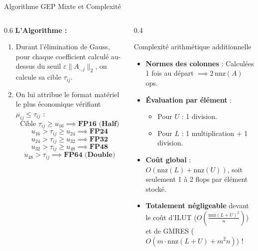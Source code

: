 \documentclass[10pt,aspectratio=169]{beamer}
\begin{document}
\begin{frame}{Algorithme GEP Mixte et Complexité}
    \begin{columns}
        \begin{column}{0.6\textwidth}
            \textbf{L'Algorithme :}
            \begin{enumerate}
                \item Durant l'élimination de Gauss, pour chaque coefficient calculé au-dessus du seuil $\varepsilon\|A_{\cdot,j}\|_2$, on calcule sa cible $\tau_{ij}$.
                \item On lui attribue le format matériel le plus économique vérifiant $\mu_{ij} \le \tau_{ij}$ :
                $$\text{Cible } \tau_{ij} \ge u_{16} \implies \textbf{FP16 (Half)}$$
                $$u_{16} > \tau_{ij} \ge u_{24} \implies \textbf{FP24}$$
                $$u_{24} > \tau_{ij} \ge u_{32} \implies \textbf{FP32}$$
                $$u_{32} > \tau_{ij} \ge u_{48} \implies \textbf{FP48}$$
                $$u_{48} > \tau_{ij} \implies \textbf{FP64 (Double)}$$
            \end{enumerate}
        \end{column}
        
        \begin{column}{0.4\textwidth}
            \begin{block}{Complexité arithmétique additionnelle}
                \begin{itemize}
                    \item \textbf{Normes des colonnes} : Calculées 1 fois au départ $\implies 2\,\text{nnz}(A)$ ops.
                    \item \textbf{Évaluation par élément} : 
                    \begin{itemize}
                        \item Pour $U$ : 1 division.
                        \item Pour $L$ : 1 multiplication + 1 division.
                    \end{itemize}
                    \item \textbf{Coût global} : $O(\text{nnz}(L) + \text{nnz}(U))$, soit seulement 1 à 2 flops par élément stocké.
                    \item \textbf{Totalement négligeable} devant le coût d'ILUT ($O(\frac{\text{nnz}(L+U)^2}{n})$) et de GMRES ($O(m \cdot \text{nnz}(L+U) + m^2 n)$) !
                \end{itemize}
            \end{block}
        \end{column}
    \end{columns}
\end{frame}
\end{document}
